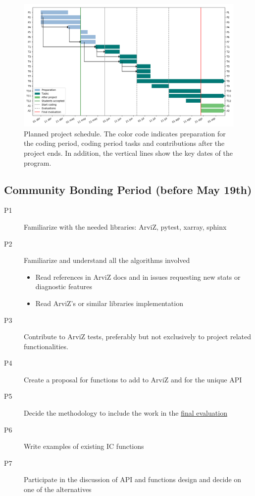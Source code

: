 \documentclass{article}
\begin{document}
\begin{figure}[!htb]
\centering
\includegraphics[width=\linewidth]{gantt.png}
\caption{Planned project schedule. The color code indicates preparation for the coding period, coding period tasks and contributions after the project ends. In addition, the vertical lines show the key dates of the program.}\label{gantt}
\end{figure}

\subsection{\texorpdfstring{\textbf{Community Bonding Period} (before
May
19th)}{Community Bonding Period (before May 19th)}}\label{community-bonding-period-before-may-19th}

\begin{description}
\item[P1] Familiarize with the needed libraries: ArviZ, pytest, xarray,
  sphinx
\item[P2] Familiarize and understand all the algorithms involved
  \begin{itemize}
    \item Read references in ArviZ docs and in issues requesting new stats or
  diagnostic features
    \item Read ArviZ's or similar libraries implementation
  \end{itemize}
\item[P3] Contribute to ArviZ tests, preferably but not exclusively to
  project related functionalities.
\item[P4] Create a proposal for functions to add to ArviZ and for the unique
  API
\item[P5] Decide the methodology to include the work in the
  \href{https://google.github.io/gsocguides/student/evaluations\#final-evaluations-and-work-product-submission}{final
  evaluation}
\item[P6] Write examples of existing IC functions
\item[P7] Participate in the discussion of API and functions design and
  decide on one of the alternatives
\end{description}\vspace{1ex}
\end{document}
